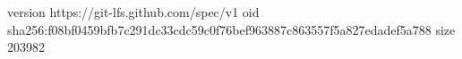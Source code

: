 version https://git-lfs.github.com/spec/v1
oid sha256:f08bf0459bfb7c291dc33cdc59c0f76bef963887c863557f5a827edadef5a788
size 203982
